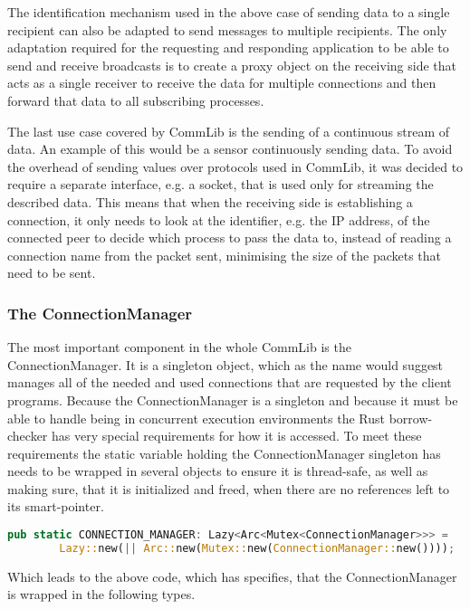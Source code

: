 The identification mechanism used in the above case of sending data to a single recipient can also be adapted to send messages to multiple recipients.
The only adaptation required for the requesting and responding application to be able to send and receive broadcasts is to create a proxy object on the receiving side that acts as a single 
receiver to receive the data for multiple connections and then forward that data to all subscribing processes.  

The last use case covered by CommLib is the sending of a continuous stream of data. An example of this would be a sensor continuously sending data. To avoid the overhead of sending values over
protocols used in CommLib, it was decided to require a separate interface, e.g. a socket, that is used only for streaming the described data. This means that when the receiving side
is establishing a connection, it only needs to look at the identifier, e.g. the IP address, of the connected peer to decide which process to pass the data to, instead of reading a connection 
name from the packet sent, minimising the size of the packets that need to be sent. 

\subsubsection{The ConnectionManager}
The most important component in the whole CommLib is the ConnectionManager. It is a singleton object, which as the name would suggest manages all of the needed and used connections that are
requested by the client programs. Because the ConnectionManager is a singleton and because it must be able to handle being in concurrent execution environments the Rust borrow-checker has very
special requirements for how it is accessed. To meet these requirements the static variable holding the ConnectionManager singleton has needs to be wrapped in several objects to ensure it is
thread-safe, as well as making sure, that it is initialized and freed, when there are no references left to its smart-pointer. 

\begin{lstlisting}[language=Rust]
	pub static CONNECTION_MANAGER: Lazy<Arc<Mutex<ConnectionManager>>> =
	    Lazy::new(|| Arc::new(Mutex::new(ConnectionManager::new())));
\end{lstlisting}
Which leads to the above code, which has specifies, that the ConnectionManager is wrapped in the following types.

